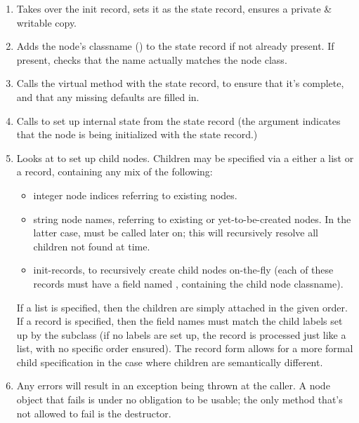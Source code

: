 \documentclass[10pt]{article}
\begin{document}
  \begin{enumerate}
  
  \item Takes over the init record,  sets it as the state record, ensures a
    private \& writable copy.
    
  \item Adds the node's classname () to the state record if not
    already present. If present, checks that the name actually matches the node
    class.

  \item Calls the virtual  method with the state record,
    to ensure that it's complete, and that any missing defaults are filled in.

  \item Calls  to set up internal state from
    the state record (the  argument indicates that the node is being
    initialized with the state record.)

  \item Looks at  to set up child nodes. Children may be
    specified via a either a list or a record, containing any mix of the
    following:

    \begin{itemize}
      \item integer node indices referring to existing nodes.

      \item string node names, referring to existing or yet-to-be-created
        nodes. In the latter case,  must be called
        later on; this will recursively resolve all children not found at
         time.

      \item init-records, to recursively create child nodes on-the-fly (each of
        these records must have a field named , containing the child
        node classname).

    \end{itemize}

    If a list is specified, then the children are simply attached in the given
    order. If a record is specified, then the field names must match the child
    labels set up by the subclass (if no labels are set up, the record is
    processed just like a list, with no specific order ensured). The record
    form allows for a more formal child specification in the case where
    children are semantically different.
    
  \item Any errors will result in an exception being thrown at the caller. A
    node object that fails  is under no obligation to be usable; the
    only method that's not allowed to fail is the destructor.

  \end{enumerate}
\end{document}
